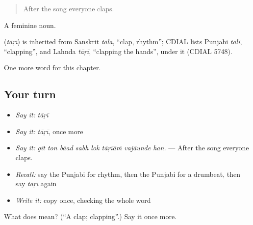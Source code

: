 \begin{quote}
After the song everyone claps.
\end{quote}

A feminine noun.

\begin{cousinweb}
\textbf{} (\emph{tāṛī}) is inherited from Sanskrit \emph{tāla}, \textquotedblleft{}clap, rhythm\textquotedblright{}; CDIAL lists Punjabi \emph{tālī}, \textquotedblleft{}clapping\textquotedblright{}, and Lahnda \emph{tāṛī}, \textquotedblleft{}clapping the hands\textquotedblright{}, under it (CDIAL 5748).
\end{cousinweb}

\begin{grammarlens}[title={What you've built}]
One more word for this chapter.
\end{grammarlens}

\subsection*{Your turn}
\begin{itemize}
\raggedright
  \item \emph{Say it:} \emph{tāṛī}
  \item \emph{Say it:} \emph{tāṛī}, once more
  \item \emph{Say it:} \emph{gīt ton bāad sabh lok tāṛīāṁ vajāunde han.} — After the song everyone claps.
  \item \emph{Recall:} say the Punjabi for rhythm, then the Punjabi for a drumbeat, then say \emph{tāṛī} again
  \item \emph{Write it:} copy \textbf{} once, checking the whole word
\end{itemize}

\begin{tcolorbox}[breakable,colback=teal!4,colframe=teal!35!black,title={Before you move on}]
What does  mean? (\textquotedblleft{}A clap; clapping\textquotedblright{}.) Say it once more.
\end{tcolorbox}
